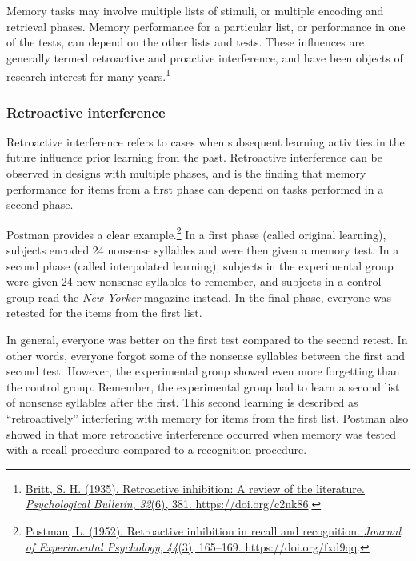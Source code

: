 \documentclass[
  oneside,
  12pt]{crumpbook}
\begin{document}
Memory tasks may involve multiple lists of stimuli, or multiple encoding and retrieval phases. Memory performance for a particular list, or performance in one of the tests, can depend on the other lists and tests. These influences are generally termed retroactive and proactive interference, and have been objects of research interest for many years.\footnote{\protect\hyperlink{ref-brittRetroactiveInhibitionReview1935}{Britt, S. H. (1935). Retroactive inhibition: A review of the literature. \emph{Psychological Bulletin}, \emph{32}(6), 381. \url{https://doi.org/c2nk86}}.}

\hypertarget{retroactive-interference}{%
\subsubsection{Retroactive interference}\label{retroactive-interference}}

Retroactive interference refers to cases when subsequent learning activities in the future influence prior learning from the past. Retroactive interference can be observed in designs with multiple phases, and is the finding that memory performance for items from a first phase can depend on tasks performed in a second phase.

Postman provides a clear example.\footnote{\protect\hyperlink{ref-postmanRetroactiveInhibitionRecall1952}{Postman, L. (1952). Retroactive inhibition in recall and recognition. \emph{Journal of Experimental Psychology}, \emph{44}(3), 165--169. \url{https://doi.org/fxd9qq}}.} In a first phase (called original learning), subjects encoded 24 nonsense syllables and were then given a memory test. In a second phase (called interpolated learning), subjects in the experimental group were given 24 new nonsense syllables to remember, and subjects in a control group read the \emph{New Yorker} magazine instead. In the final phase, everyone was retested for the items from the first list.

In general, everyone was better on the first test compared to the second retest. In other words, everyone forgot some of the nonsense syllables between the first and second test. However, the experimental group showed even more forgetting than the control group. Remember, the experimental group had to learn a second list of nonsense syllables after the first. This second learning is described as ``retroactively'' interfering with memory for items from the first list. Postman also showed in that more retroactive interference occurred when memory was tested with a recall procedure compared to a recognition procedure.
\end{document}
